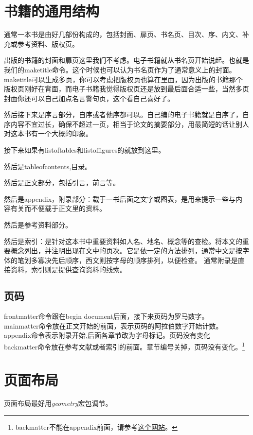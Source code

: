 \section{书籍的通用结构}
通常一本书是由好几部份构成的，包括封面、扉页、书名页、目次、序、内文、补充或参考资料、版权页。

出版的书籍的封面和扉页这里我们不考虑。电子书籍就从书名页开始说起。也就是我们的maketitle命令。这个时候也可以认为书名页作为了通常意义上的封面。maketitle可以生成多页，你可以考虑把版权页也算在里面，因为出版的书籍那个版权页刚好在背面，而电子书籍我觉得版权页还是放到最后面合适一些，当然多页封面你还可以自己加点名言警句页，这个看自己喜好了。

然后接下来是序言部分，自序或者他序都可以。自己编的电子书籍就是自序了，自序内容不宜过长，确保不超过一页，相当于论文的摘要部分，用最简短的话让别人对这本书有一个大概的印象。

接下来如果有listoftables和listoffigures的就放到这里。

然后是tableofcontents,目录。

然后是正文部分，包括引言，前言等。

然后是appendix，附录部分：载于一书后面之文字或图表，是用来提示一些与内容有关而不便载于正文里的资料。

然后是参考资料部分。

然后是索引：是针对这本书中重要资料如人名、地名、概念等的查检。将本文的重要概念列出，并注明出现在文中的页次。它是依一定的方法排列，通常中文是按字体的笔划多寡决先后顺序，西文则按字母的顺序排列，以便检查。 通常附录是直接资料，索引则是提供查询资料的线索。


\subsection{页码}
\label{sec:页码}
frontmatter命令跟在begin document后面，接下来页码为罗马数字。\\
mainmatter命令放在正文开始的前面，表示页码的阿拉伯数字开始计数。\\ 
appendix命令表示附录开始,后面各章节改为字母标记。页码没有变化\\
backmatter命令放在参考文献或者索引的前面。章节编号关掉，页码没有变化。\footnote{backmatter不能在appendix前面，请参考\href{http://tex.stackexchange.com/questions/20538/what-is-the-right-order-when-using-frontmatter-tableofcontents-mainmatter}{这个网站}。}


\section{页面布局}
页面布局最好用\emph{geometry}宏包调节。

